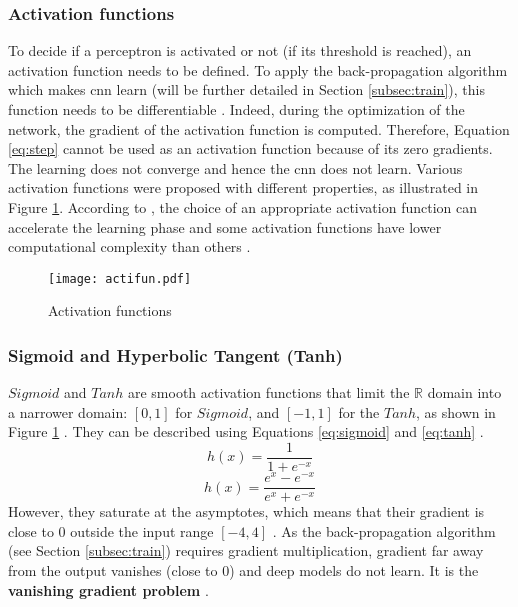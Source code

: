 \subsubsection{Activation functions} \label{subs:acti}
To decide if a perceptron is activated or not (if its threshold is reached), an activation function needs to be defined. To apply the back-propagation algorithm which makes \acrshort{cnn} learn (will be further detailed in Section \ref{subsec:train}), this function needs to be differentiable \cite{lecun_backpropagation_1989}. Indeed, during the optimization of the network, the gradient of the activation function is computed. Therefore, Equation \ref{eq:step} cannot be used as an activation function because of its zero gradients. The learning does not converge and hence the \acrshort{cnn} does not learn. Various activation functions were proposed with different properties, as illustrated in Figure \ref{fig:acti}. According to \textcite{khan_survey_2020}, the choice of an appropriate activation function can accelerate the learning phase and some activation functions have lower computational complexity than others \cite{krizhevsky_imagenet_2012}.
%
\begin{figure}[H]
    \centering
    \texttt{[image: actifun.pdf]}
    \caption{Activation functions}
    \label{fig:acti}
\end{figure}
%
\subsubsection{Sigmoid and Hyperbolic Tangent (Tanh)}
$Sigmoid$ and $Tanh$ are smooth activation functions that limit the $\mathbb{R}$ domain into a narrower domain: $[0, 1]$ for $Sigmoid$, and $[-1, 1]$ for the $Tanh$, as shown in Figure \ref{fig:acti} \cite{matteucci_artificial_2019}. They can be described using Equations \eqref{eq:sigmoid} and \eqref{eq:tanh} \cite{krizhevsky_imagenet_2012}.
%
\begin{equation}
    h(x) = \frac{1}{1 + e^{-x}}
    \label{eq:sigmoid}
\end{equation}
%
\begin{equation}
    h(x) = \frac{e^{x} - e^{-x}}{e^{x} + e^{-x}}
    \label{eq:tanh}
\end{equation}
%
However, they saturate at the asymptotes, which means that their gradient is close to 0 outside the input range $[-4, 4]$ \cite{glorot_understanding_2010}. As the back-propagation algorithm (see Section \ref{subsec:train}) requires gradient multiplication, gradient far away from the output vanishes (close to 0) and deep models do not learn. It is the \textbf{vanishing gradient problem} \cite{khan_survey_2020, matteucci_artificial_2019, goodfellow_deep_2016, maas_rectier_2013}.
%
